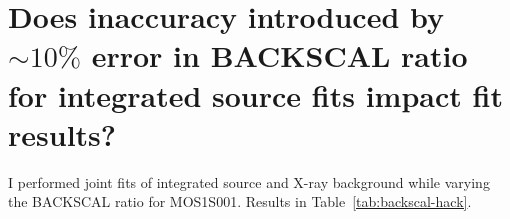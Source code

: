 \documentclass[preprint2,tighten,trackchanges]{aastex6}
\newcommand*{\abt}{\mathord{\sim}} %
\begin{document}
\begin{figure*}[]
    \label{fig:nonthermal}
\end{figure*}


\section{Does inaccuracy introduced by $\abt 10\%$ error in BACKSCAL ratio for
integrated source fits impact fit results?}

I performed joint fits of integrated source and X-ray background while
varying the BACKSCAL ratio for MOS1S001.
Results in Table~\ref{tab:backscal-hack}.
\end{document}

